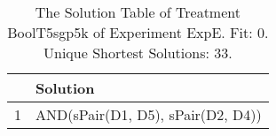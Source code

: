 \begin{table}[ht]
\centering
\begin{tabular}{rp{9cm}}
  \hline
 & Solution \\ 
  \hline
1 & AND(sPair(D1, D5), sPair(D2, D4)) \\ 
   \hline
\end{tabular}
\caption{The Solution Table of Treatment BoolT5sgp5k of Experiment ExpE. Fit: 0. Unique Shortest Solutions: 33.} 
\end{table}
